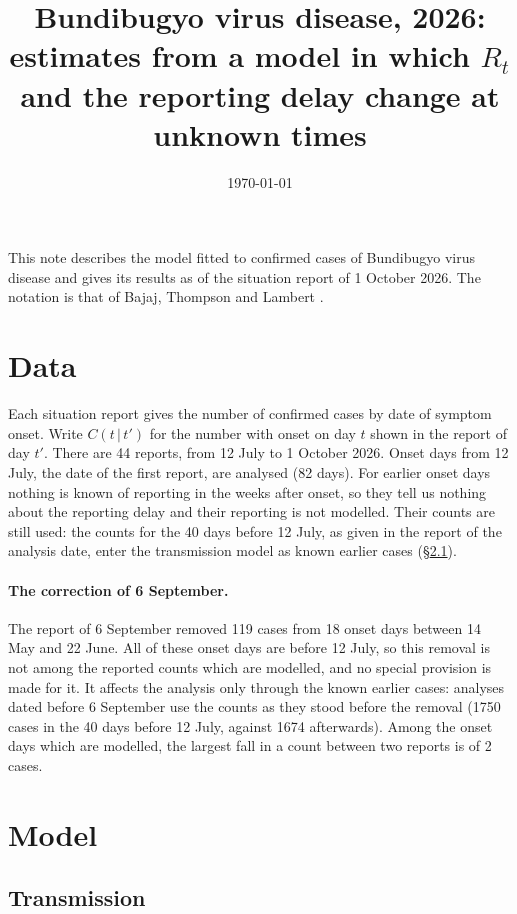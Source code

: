 \documentclass[11pt,a4paper]{article}
\title{Bundibugyo virus disease, 2026: estimates from a model in which $R_t$
and the reporting delay change at unknown times}
\author{}
\date{\today}
\newcommand{\given}{\,|\,}
\newcommand{\resultsinput}[1]{%
  \IfFileExists{../outputs/tables/#1}{}{}}
\begin{document}
\resultsinput{bvd_numbers.tex}
\maketitle

This note describes the model fitted to confirmed cases of Bundibugyo virus
disease and gives its results as of the situation report of 1 October 2026.
The notation is that of Bajaj, Thompson and Lambert \cite{bajaj2025}.

\section{Data}

Each situation report gives the number of confirmed cases by date of symptom
onset. Write $C(t\given t')$ for the number with onset on day $t$ shown in the
report of day $t'$. There are 44 reports, from 12 July to 1 October 2026.
Onset days from 12 July, the date of the first report, are analysed (82
days). For earlier onset days nothing is known of reporting in the weeks after
onset, so they tell us nothing about the reporting delay and their reporting
is not modelled. Their counts are still used: the counts for the 40 days
before 12 July, as given in the report of the analysis date, enter the
transmission model as known earlier cases (\S\ref{sec:transmission}).

\paragraph{The correction of 6 September.} The report of 6 September removed
119 cases from 18 onset days between 14 May and 22 June. All of these onset
days are before 12 July, so this removal is not among the reported counts
which are modelled, and no special provision is made for it. It affects the
analysis only through the known earlier cases: analyses dated before 6
September use the counts as they stood before the removal (1750 cases in the
40 days before 12 July, against 1674 afterwards). Among the onset days which
are modelled, the largest fall in a count between two reports is of 2
cases.

\section{Model}\label{sec:model}

\subsection{Transmission}\label{sec:transmission}
\end{document}
